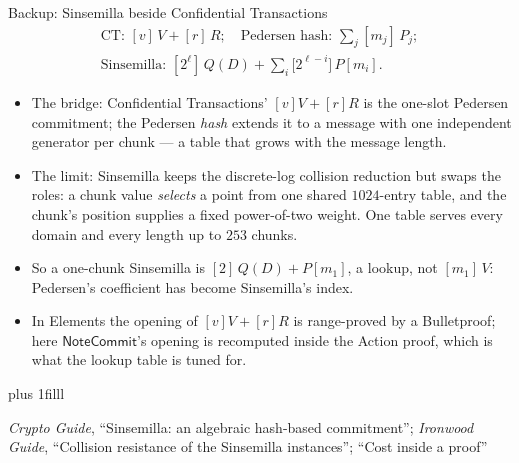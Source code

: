 \documentclass[aspectratio=169,11pt]{beamer}
\newcommand{\NoteCommit}{\ensuremath{\mathsf{NoteCommit}}}
\newcommand{\src}[1]{\par\vskip0pt plus 1filll
  {\fontsize{6}{7.2}\selectfont\color{arbdim}\raggedright #1\par}}
\begin{document}
\begin{frame}{Backup: Sinsemilla beside Confidential Transactions}
\vspace*{-8pt}
\setlength{\abovedisplayskip}{3pt}\setlength{\belowdisplayskip}{3pt}
\begin{gather*}
\text{CT: } [v]\,V + [r]\,R; \quad
\text{Pedersen hash: } \textstyle\sum_{j} [m_j]\,P_j; \\
\text{Sinsemilla: } [2^{\ell}]\,Q(D) + \textstyle\sum_{i}
  \bigl[2^{\ell - i}\bigr]\, P[m_i].
\end{gather*}
\begin{itemize}\small
  \item The bridge: Confidential Transactions' $[v]V + [r]R$ is the
    one-slot Pedersen commitment; the Pedersen \emph{hash} extends it to
    a message with one independent generator per chunk --- a table that
    grows with the message length.
  \item The limit: Sinsemilla keeps the discrete-log collision reduction
    but swaps the roles: a chunk value \emph{selects} a point from one
    shared $1024$-entry table, and the chunk's position supplies a fixed
    power-of-two weight. One table serves every domain and every length
    up to $253$ chunks.
  \item So a one-chunk Sinsemilla is $[2]\,Q(D) + P[m_1]$, a lookup, not
    $[m_1]\,V$: Pedersen's coefficient has become Sinsemilla's index.
  \item In Elements the opening of $[v]V + [r]R$ is range-proved by a
    Bulletproof; here $\NoteCommit$'s opening is recomputed inside the
    Action proof, which is what the lookup table is tuned for.
\end{itemize}
\src{\emph{Crypto Guide}, ``Sinsemilla: an algebraic hash-based commitment'';
\emph{Ironwood Guide}, ``Collision resistance of the Sinsemilla instances'';
``Cost inside a proof''}
\end{frame}
\end{document}
